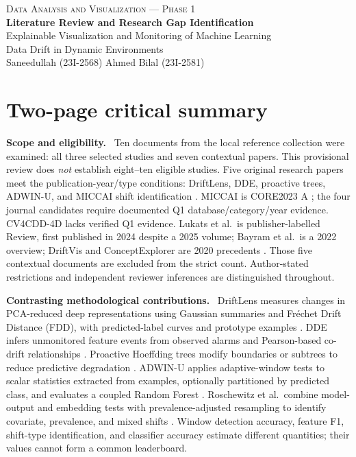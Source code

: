 \documentclass[10pt,a4paper]{article}
\newcommand{\lead}[1]{\textbf{#1}\ }
\begin{document}
\pagestyle{plain}
\begin{center}
{\small\textsc{Data Analysis and Visualization --- Phase 1}}\\[3pt]
{\Large\bfseries Literature Review and Research Gap Identification}\\[4pt]
{\normalsize Explainable Visualization and Monitoring of Machine Learning\\
Data Drift in Dynamic Environments}\\[4pt]
{\small Saneedullah (23I-2568) \quad Ahmed Bilal (23I-2581)}
\end{center}

\section*{Two-page critical summary}
\lead{Scope and eligibility.}
Ten documents from the local reference collection were examined: all three selected studies and seven contextual papers. This provisional review does \emph{not} establish eight--ten eligible studies. Five original research papers meet the publication-year/type conditions: DriftLens, DDE, proactive trees, ADWIN-U, and MICCAI shift identification \cite{greco,szucs,guerrero,assis,roschewitz}. MICCAI is CORE2023 A \cite{core}; the four journal candidates require documented Q1 database/category/year evidence. CV4CDD-4D lacks verified Q1 evidence. Lukats et al.\ is publisher-labelled Review, first published in 2024 despite a 2025 volume; Bayram et al.\ is a 2022 overview; DriftVis and ConceptExplorer are 2020 precedents \cite{kraus,lukats,bayram,driftvis,conceptexplorer}. Those five contextual documents are excluded from the strict count. Author-stated restrictions and independent reviewer inferences are distinguished throughout.

\lead{Contrasting methodological contributions.}
DriftLens measures changes in PCA-reduced deep representations using Gaussian summaries and Fr\'echet Drift Distance (FDD), with predicted-label curves and prototype examples \cite[Secs.~IV--V]{greco}. DDE infers unmonitored feature events from observed alarms and Pearson-based co-drift relationships \cite[Secs.~2,4--5]{szucs}. Proactive Hoeffding trees modify boundaries or subtrees to reduce predictive degradation \cite[Secs.~4--6]{guerrero}. ADWIN-U applies adaptive-window tests to scalar statistics extracted from examples, optionally partitioned by predicted class, and evaluates a coupled Random Forest \cite[Secs.~4--6]{assis}. Roschewitz et al.\ combine model-output and embedding tests with prevalence-adjusted resampling to identify covariate, prevalence, and mixed shifts \cite[Secs.~3--5]{roschewitz}. Window detection accuracy, feature F1, shift-type identification, and classifier accuracy estimate different quantities; their values cannot form a common leaderboard.
\end{document}
